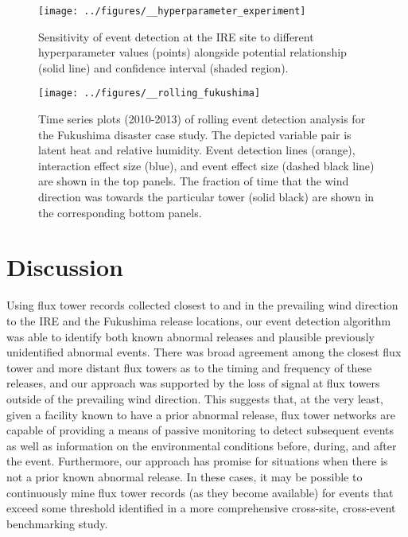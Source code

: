 \documentclass{article}
\begin{document}
\begin{figure}
	\centering
	\texttt{[image: ../figures/\_\_hyperparameter\_experiment]}
	\caption{Sensitivity of event detection at the IRE site to different hyperparameter values (points) alongside potential relationship (solid line) and confidence interval (shaded region).}
	\label{fig:hyperparameter}
\end{figure}

\begin{figure}
	\centering
	\texttt{[image: ../figures/\_\_rolling\_fukushima]}
	\caption{Time series plots (2010-2013) of rolling event detection analysis for the Fukushima disaster case study. The depicted variable pair is latent heat and relative humidity. Event detection lines (orange), interaction effect size (blue), and event effect size (dashed black line) are shown in the top panels. The fraction of time that the wind direction was towards the particular tower (solid black) are shown in the corresponding bottom panels.}
	\label{fig:fukushima}
\end{figure}

\section{Discussion}
Using flux tower records collected closest to and in the prevailing wind direction to the IRE and the Fukushima release locations, our event detection algorithm was able to identify both known abnormal releases and plausible previously unidentified abnormal events. There was broad agreement among the closest flux tower and more distant flux towers as to the timing and frequency of these releases, and our approach was supported by the loss of signal at flux towers outside of the prevailing wind direction. This suggests that, at the very least, given a facility known to have a prior abnormal release, flux tower networks are capable of providing a means of passive monitoring to detect subsequent events as well as information on the environmental conditions before, during, and after the event. Furthermore, our approach has promise for situations when there is not a prior known abnormal release. In these cases, it may be possible to continuously mine flux tower records (as they become available) for events that exceed some threshold identified in a more comprehensive cross-site, cross-event benchmarking study.
\end{document}
